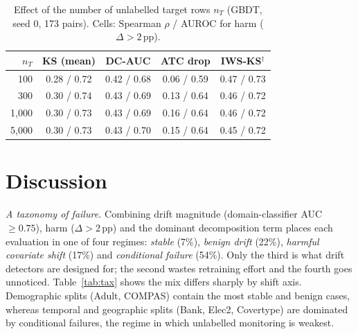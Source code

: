 \documentclass[conference]{IEEEtran}
\theoremstyle{plainhead}
\newcommand{\pp}{\,pp}
\begin{document}
\begin{table}[t]
\centering
\caption{Effect of the number of unlabelled target rows $n_T$ (GBDT, seed 0, 173 pairs). Cells: Spearman $\rho$ / AUROC for harm ($\Delta>2$\pp).}
\label{tab:nsize}
\footnotesize
\setlength{\tabcolsep}{3.5pt}
\begin{tabular}{rcccc}
\toprule
$n_T$ & KS (mean) & DC-AUC & ATC drop & IWS-KS$^\dagger$ \\
\midrule
100 & 0.28 / 0.72 & 0.42 / 0.68 & 0.06 / 0.59 & 0.47 / 0.73 \\
300 & 0.30 / 0.74 & 0.43 / 0.69 & 0.13 / 0.64 & 0.46 / 0.72 \\
1{,}000 & 0.30 / 0.73 & 0.43 / 0.69 & 0.16 / 0.64 & 0.46 / 0.72 \\
5{,}000 & 0.30 / 0.73 & 0.43 / 0.70 & 0.15 / 0.64 & 0.45 / 0.72 \\
\bottomrule
\end{tabular}
\end{table}

\section{Discussion}
\textit{A taxonomy of failure.} Combining drift magnitude (domain-classifier AUC $\ge0.75$), harm ($\Delta>2$\pp) and the dominant decomposition term places each evaluation in one of four regimes: \emph{stable} (7\%), \emph{benign drift} (22\%), \emph{harmful covariate shift} (17\%) and \emph{conditional failure} (54\%). Only the third is what drift detectors are designed for; the second wastes retraining effort and the fourth goes unnoticed. Table~\ref{tab:tax} shows the mix differs sharply by shift axis. Demographic splits (Adult, COMPAS) contain the most stable and benign cases, whereas temporal and geographic splits (Bank, Elec2, Covertype) are dominated by conditional failures, the regime in which unlabelled monitoring is weakest.
\end{document}
